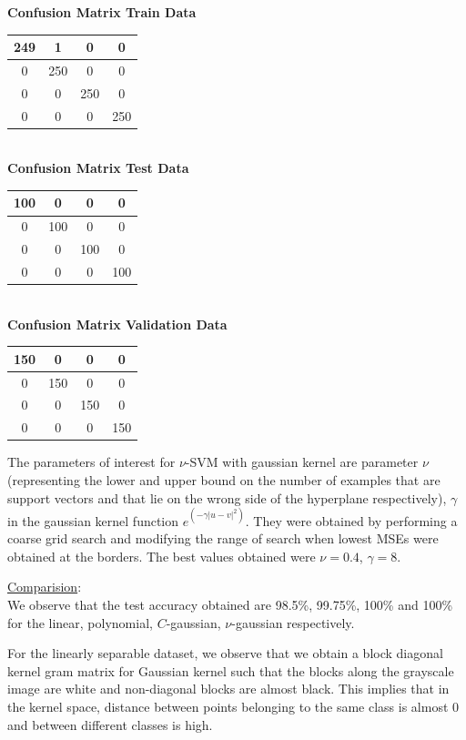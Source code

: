\documentclass{article}
\begin{document}
\begin{flushleft}
\textbf{Confusion Matrix Train Data\\[5pt]}
\begin{tabular}{|c|c|c|c|}
\hline
249 & 1 & 0 & 0 \\
\hline
0 & 250 & 0 & 0 \\
\hline
0 & 0 & 250 & 0 \\
\hline
0 & 0 & 0 & 250 \\
\hline
\end{tabular}
\textbf{\\[10pt] Confusion Matrix Test Data \\[5pt]}
\begin{tabular}{|c|c|c|c|}
\hline
100 & 0 & 0 & 0 \\
\hline
0 & 100 & 0 & 0 \\
\hline
0 & 0 & 100 & 0 \\
\hline
0 & 0 & 0 & 100 \\
\hline
\end{tabular}
\textbf{\\[10pt] Confusion Matrix Validation Data \\[5pt]}
\begin{tabular}{|c|c|c|c|}
\hline
150 & 0 & 0 & 0 \\
\hline
0 & 150 & 0 & 0 \\
\hline
0 & 0 & 150 & 0 \\
\hline
0 & 0 & 0 & 150 \\
\hline
\end{tabular}
\end{flushleft}


The parameters of interest for $\nu$-SVM with gaussian kernel are parameter $\nu$(representing the lower and upper bound on the number of examples that are support vectors and that lie on the wrong side of the hyperplane respectively), $\gamma$ in the gaussian kernel function $e^{(-\gamma|u-v|^{2})}$. They were obtained by performing a coarse grid search and modifying the range of search when lowest MSEs were obtained at the borders.
The best values obtained were $\nu=0.4$, $\gamma=8$.

\underline{Comparision}:\\
We observe that the test accuracy obtained are 98.5\%, 99.75\%, 100\% and 100\% for the linear, polynomial, $C$-gaussian, $\nu$-gaussian respectively. 

For the linearly separable dataset, we observe that we obtain a block diagonal kernel gram matrix for Gaussian kernel such that the blocks along the grayscale image are white and non-diagonal blocks are almost black. This implies that in the kernel space, distance between points belonging to the same class is almost 0 and between different classes is high.
\end{document}
